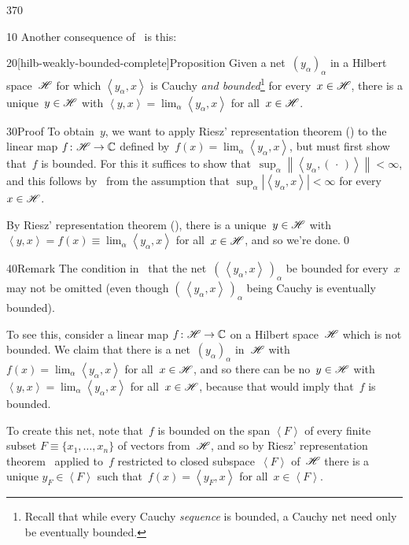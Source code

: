 \begin{parsec}{370}%
\begin{point}{10}%
	Another consequence of~
	is this:
\end{point}
\begin{point}{20}[hilb-weakly-bounded-complete]{Proposition}%
Given a net~$(y_\alpha)_\alpha$
in a Hilbert space~$\mathscr{H}$
for which $\left<y_\alpha,x\right>$
is Cauchy \emph{and bounded}\footnote{Recall that while every Cauchy
\emph{sequence} is bounded,
a Cauchy net need only be eventually bounded.}
for every~$x\in \mathscr{H}$,
there is a unique~$y\in\mathscr{H}$
with $\left<y,x\right>=\lim_\alpha \left<y_\alpha,x\right>$
for all~$x\in\mathscr{H}$.
\begin{point}{30}{Proof}%
To obtain~$y$,
we want to apply  Riesz' representation theorem
()
to the linear map $f\colon \mathscr{H}\to\mathbb{C}$
defined by~$f(x)=\lim_\alpha\left<y_\alpha,x\right>$,
but must first show that~$f$ is bounded.
For this it suffices to show
that~$\sup_\alpha \left \|\left<y_\alpha,(\,\cdot\,)\right>\right\|<\infty$,
and this follows by~
from the assumption 
that $\sup_{\alpha} \left|\left<y_\alpha,x\right>\right| <\infty$
for every~$x\in \mathscr{H}$.

By Riesz' representation theorem (),
there is a unique~$y\in\mathscr{H}$ with 
$\left<y,x\right>=f(x)\equiv \lim_\alpha \left<y_\alpha,x\right>$
for all~$x\in \mathscr{H}$,
and so we're done.\qed
\end{point}
\begin{point}{40}{Remark}%
The condition in~ 
that the net~$(\,\left<y_\alpha,x\right>\,)_\alpha$
be bounded for every~$x$ may not be omitted
(even though $(\,\left<y_\alpha,x\right>\,)_\alpha$
being Cauchy is eventually bounded).

To see this,
consider a linear map $f\colon \mathscr{H}\to\mathbb{C}$ on a Hilbert space~$\mathscr{H}$
which is not bounded.
We claim that there is a net~$(y_\alpha)_\alpha$ in~$\mathscr{H}$
with $f(x)=\lim_\alpha \left<y_\alpha,x\right>$ for all~$x\in\mathscr{H}$,
and so there can be no~$y\in \mathscr{H}$ 
with $\left<y,x\right> = \lim_\alpha \left<y_\alpha,x\right>$
for all~$x\in \mathscr{H}$, because 
that would imply that~$f$ is bounded.

To create this net,
note that~$f$ is bounded
on the span $\left<F\right>$ of every 
finite subset $F\equiv \{x_1,\dotsc,x_n\}$
of vectors from~$\mathscr{H}$,
and so by Riesz' representation theorem~
applied to~$f$ restricted to closed subspace~$\left<F\right>$
of~$\mathscr{H}$ there is a unique $y_F\in \left<F\right>$
such that~$f(x)=\left<y_F,x\right>$
for all~$x\in\left<F\right>$.


\end{point}
\end{point}
\end{parsec}
